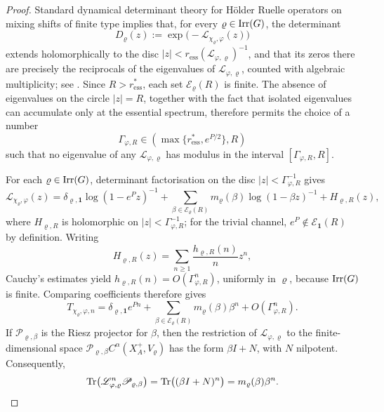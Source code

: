 \begin{proof}
  Standard dynamical determinant theory for H\"older Ruelle operators
  on mixing shifts of finite type implies that, for every
  \(\varrho\in\operatorname{Irr}(G)\), the determinant
  \[
    D_\varrho(z)
    :=
    \exp\!\bigl(-\mathcal L_{\chi_\varrho,\varphi}(z)\bigr)
  \]
  extends holomorphically to the disc
  \(|z|<r_{\mathrm{ess}}(\mathscr L_{\varphi,\varrho})^{-1}\), and that
  its zeros there are precisely the reciprocals of the eigenvalues of
  \(\mathscr L_{\varphi,\varrho}\), counted with algebraic multiplicity;
  see
  \cite{Ruelle1978Thermodynamic,Baladi2000PositiveTransfer,%
  Baladi2018ZetaDeterminants,AdachiSunada1987TwistedPerronFrobenius}.
  Since \(R>r_{\mathrm{ess}}^\ast\), each set
  \(\mathcal E_\varrho(R)\) is finite. The absence of eigenvalues on
  the circle \(|z|=R\), together with the fact that isolated
  eigenvalues can accumulate only at the essential spectrum, therefore
  permits the choice of a number
  \[
    \Gamma_{\varphi,R}\in(\max\{r_{\mathrm{ess}}^\ast,e^{P/2}\},R)
  \]
  such that no eigenvalue of any \(\mathscr L_{\varphi,\varrho}\) has
  modulus in the interval \([\Gamma_{\varphi,R},R]\).

  For each \(\varrho\in\operatorname{Irr}(G)\), determinant factorisation on the disc
  \(|z|<\Gamma_{\varphi,R}^{-1}\) gives
  \[
    \mathcal L_{\chi_\varrho,\varphi}(z)
    =
    \delta_{\varrho,\mathbf 1}\log(1-e^Pz)^{-1}
    +
    \sum_{\beta\in\mathcal E_\varrho(R)}
      m_\varrho(\beta)\log(1-\beta z)^{-1}
    +H_{\varrho,R}(z),
  \]
  where \(H_{\varrho,R}\) is holomorphic on
  \(|z|<\Gamma_{\varphi,R}^{-1}\); for the trivial channel,
  \(e^P\notin\mathcal E_{\mathbf 1}(R)\) by definition. Writing
  \[
    H_{\varrho,R}(z)=\sum_{n\ge 1}\frac{h_{\varrho,R}(n)}{n}z^n,
  \]
  Cauchy's estimates yield \(h_{\varrho,R}(n)=O(\Gamma_{\varphi,R}^n)\),
  uniformly in \(\varrho\), because \(\operatorname{Irr}(G)\) is finite. Comparing
  coefficients therefore gives
  \begin{equation}\label{eq:holder-transfer-spectral-window-traces}
    T_{\chi_\varrho,\varphi,n}
    =
    \delta_{\varrho,\mathbf 1}e^{Pn}
    +
    \sum_{\beta\in\mathcal E_\varrho(R)}
      m_\varrho(\beta)\beta^n
    +O(\Gamma_{\varphi,R}^n).
  \end{equation}
  If \(\mathscr P_{\varrho,\beta}\) is the Riesz projector for
  \(\beta\), then the restriction of \(\mathscr L_{\varphi,\varrho}\)
  to the finite-dimensional space
  \(\mathscr P_{\varrho,\beta}C^\alpha(X_A^+,V_\varrho)\) has the form
  \(\beta I+N\), with \(N\) nilpotent. Consequently,
  \[
    \operatorname{Tr}\bigl(\mathscr L_{\varphi,\varrho}^n\mathscr P_{\varrho,\beta}\bigr)
    =
    \operatorname{Tr}\bigl((\beta I+N)^n\bigr)
    =m_\varrho(\beta)\beta^n.
  \]


\end{proof}
